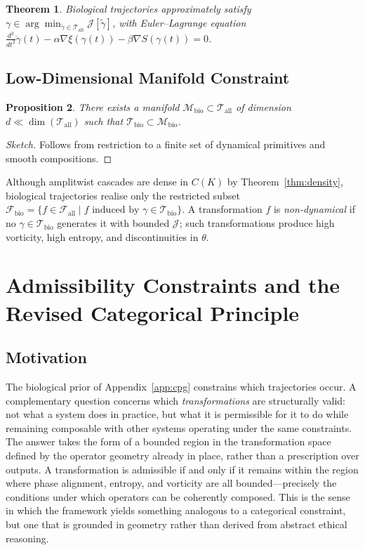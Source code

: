 \documentclass[12pt, a4paper]{article}
\newtheorem{theorem}{Theorem}[section]
\newtheorem{proposition}[theorem]{Proposition}
\theoremstyle{remark}
\theoremstyle{definition}
\begin{document}
\begin{theorem}
Biological trajectories approximately satisfy
$\gamma \in \arg\min_{\tilde\gamma \in \mathcal{T}_{\mathrm{all}}} \mathcal{J}[\tilde\gamma]$,
with Euler--Lagrange equation
$\frac{d^2}{dt^2}\ddot\gamma(t) - \alpha\nabla\xi(\gamma(t)) - \beta\nabla S(\gamma(t)) = 0$.
\end{theorem}

\subsection{Low-Dimensional Manifold Constraint}

\begin{proposition}
There exists a manifold $\mathcal{M}_{\mathrm{bio}} \subset \mathcal{T}_{\mathrm{all}}$ of
dimension $d \ll \dim(\mathcal{T}_{\mathrm{all}})$ such that $\mathcal{T}_{\mathrm{bio}}
\subset \mathcal{M}_{\mathrm{bio}}$.
\end{proposition}

\begin{proof}[Sketch]
Follows from restriction to a finite set of dynamical primitives and smooth compositions.
\end{proof}

Although amplitwist cascades are dense in $C(K)$ by Theorem~\ref{thm:density}, biological
trajectories realise only the restricted subset $\mathcal{F}_{\mathrm{bio}} = \{f \in
\mathcal{F}_{\mathrm{all}} \mid f \text{ induced by } \gamma \in \mathcal{T}_{\mathrm{bio}}\}$.
A transformation $f$ is \emph{non-dynamical} if no $\gamma \in \mathcal{T}_{\mathrm{bio}}$
generates it with bounded $\mathcal{J}$; such transformations produce high vorticity, high
entropy, and discontinuities in $\theta$.

\section{Admissibility Constraints and the Revised Categorical Principle}
\label{app:admissibility}

\subsection{Motivation}

The biological prior of Appendix~\ref{app:cpg} constrains which trajectories occur.  A
complementary question concerns which \emph{transformations} are structurally valid: not
what a system does in practice, but what it is permissible for it to do while remaining
composable with other systems operating under the same constraints.  The answer takes the
form of a bounded region in the transformation space defined by the operator geometry
already in place, rather than a prescription over outputs.  A transformation is admissible
if and only if it remains within the region where phase alignment, entropy, and vorticity
are all bounded---precisely the conditions under which operators can be coherently composed.
This is the sense in which the framework yields something analogous to a categorical
constraint, but one that is grounded in geometry rather than derived from abstract ethical
reasoning.
\end{document}
